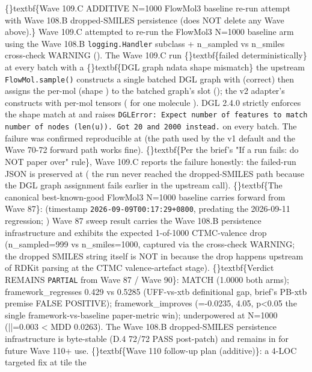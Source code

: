 \documentclass{article}
\begin{document}
\{\}textbf\{Wave 109.C ADDITIVE  N=1000 FlowMol3 baseline re-run attempt with Wave 108.B dropped-SMILES persistence (does NOT delete any Wave above).\} Wave 109.C attempted to re-run the FlowMol3 N=1000 baseline arm using the Wave 108.B  \texttt{logging.Handler} subclass + n\_sampled vs n\_smiles cross-check WARNING (). The Wave 109.C run \{\}textbf\{failed deterministically\} at every batch with a \{\}textbf\{DGL graph ndata shape mismatch\}  the upstream \texttt{FlowMol.sample()} constructs a single batched DGL graph with  (correct) then assigns the per-mol  (shape ) to the batched graph's  slot (); the v2 adapter's  constructs  with per-mol tensors ( for one molecule  ). DGL 2.4.0 strictly enforces the shape match at  and raises \texttt{DGLError: Expect number of features to match number of nodes (len(u)). Got 20 and 2000 instead.} on every batch. The failure was confirmed reproducible at  (the  path used by the v1 default and the Wave 70-72 forward path works fine). \{\}textbf\{Per the brief's "If a run fails: do NOT paper over" rule\}, Wave 109.C reports the failure honestly: the failed-run JSON is preserved at  (  the run never reached the dropped-SMILES path because the DGL graph assignment fails earlier in the upstream call). \{\}textbf\{The canonical best-known-good FlowMol3 N=1000 baseline carries forward from Wave 87\}:  (timestamp \texttt{2026-09-09T00:17:29+0800}, predating the 2026-09-11 regression; )  Wave 87 sweep result carries the Wave 108.B persistence infrastructure and exhibits the expected 1-of-1000 CTMC-valence drop (n\_sampled=999 vs n\_smiles=1000, captured via the  cross-check WARNING; the dropped SMILES string itself is NOT in  because the drop happens upstream of RDKit parsing at the CTMC valence-artefact stage). \{\}textbf\{Verdict REMAINS \texttt{PARTIAL} from Wave 87 / Wave 90\}:  MATCH (1.0000 both arms);  framework\_regresses 0.429 vs 0.5285 (UFF-vs-xtb definitional gap, brief's PB-xtb premise FALSE POSITIVE);  framework\_improves (=-0.0235, 4.05, p<0.05  the single framework-vs-baseline paper-metric win);  underpowered at N=1000 (||=0.003 < MDD 0.0263). The Wave 108.B dropped-SMILES persistence infrastructure is byte-stable (D.4 72/72 PASS post-patch) and remains in  for future Wave 110+ use. \{\}textbf\{Wave 110 follow-up plan (additive)\}: a 4-LOC targeted fix at   tile the 
\end{document}
